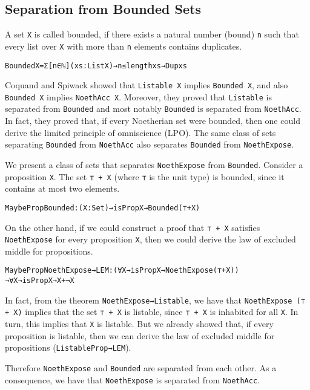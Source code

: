 \documentclass{eptcs}
\begin{document}
\subsection{Separation from Bounded Sets}

A set \verb;X; is called bounded, if there exists a natural number (bound) \verb;n; such
that every list over \verb;X; with more than \verb;n; elements contains
duplicates.
\begin{alltt}
Bounded X = Σ[ n ∈ ℕ ] (xs : List X) → n ≤ length xs → Dup xs
\end{alltt}
Coquand and Spiwack \cite{Coquand} showed  that \verb;Listable X; implies
\verb;Bounded X;, and also \verb;Bounded X; implies
\verb;NoethAcc X;. Moreover, they proved that \verb;Listable; is
separated from \verb;Bounded; and most notably \verb;Bounded; is
separated from \verb;NoethAcc;. In fact, they proved that, if every
Noetherian set were bounded, then one could derive the limited principle of
omniscience (LPO).  The same class of sets separating \verb;Bounded; from
\verb;NoethAcc; also separates \verb;Bounded; from \verb;NoethExpose;.

We present a class of sets that separates \verb;NoethExpose; from \verb;Bounded;. Consider
a proposition \verb;X;. The set \verb;⊤ + X; (where \verb;⊤; is the unit type)
is bounded, since it contains at most two elements.
\begin{alltt}
MaybePropBounded : (X : Set) → isProp X → Bounded (⊤ + X)
\end{alltt}
On the other hand, if we could construct a proof that \verb;⊤ + X;
satisfies \verb;NoethExpose; for every proposition \verb;X;, then we
could derive the law of excluded middle for propositions. 
\begin{alltt}
MaybePropNoethExpose→LEM : (∀ X → isProp X → NoethExpose (⊤ + X))
  → ∀ X → isProp X → X + ¬ X
\end{alltt}
In fact, from the theorem \verb;NoethExpose→Listable;, we have that
\verb;NoethExpose (⊤ + X); implies that the set \verb;⊤ + X; is listable, since
\verb;⊤ + X; is inhabited for all \verb;X;. In turn, this implies that \verb;X;
is listable. But we already showed that, if every proposition is listable, then
we can derive the law of excluded middle for propositions
(\verb;ListableProp→LEM;).

Therefore \verb;NoethExpose; and \verb;Bounded; are separated from each other.
As a consequence, we have that \verb;NoethExpose; is separated from \verb;NoethAcc;.
\end{document}
